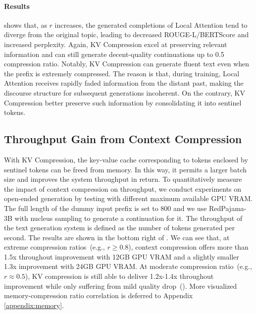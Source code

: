 \paragraph{Results}  shows that, as $r$ increases, the generated completions of Local Attention tend to diverge from the original topic, leading to decreased ROUGE-L/BERTScore and increased perplexity. Again, KV Compression excel at preserving relevant information and can still generate decent-quality continuations up to 0.5 compression ratio. Notably, KV Compression can generate fluent text even when the prefix is extremely compressed. The reason is that, during training, Local Attention receives rapidly faded information from the distant past, making the discourse structure for subsequent generations incoherent. On the contrary, KV Compression better preserve such information by consolidating it into sentinel tokens.

\subsection{Throughput Gain from Context Compression}
With KV Compression, the key-value cache corresponding to tokens enclosed by sentinel tokens can be freed from memory. In this way, it permits a larger batch size and improves the system throughput in return. To quantitatively measure the impact of context compression on throughput, we conduct experiments on open-ended generation by testing with different maximum available GPU VRAM. 
The full length of the dummy input prefix is set to 800 and we use RedPajama-3B with nucleus sampling to generate a continuation for it. The throughput of the text generation system is defined as the number of tokens generated per second. The results are shown in the bottom right of . We can see that, at extreme compression ratios~(e.g., $r\geq 0.8$), context compression offers more than 1.5x throughout improvement with 12GB GPU VRAM and a slightly smaller 1.3x improvement with 24GB GPU VRAM. 
At moderate compression ratio~(e.g., $r\approx 0.5$), KV compression is still able to deliver 1.2x-1.4x throughout improvement while only suffering from mild quality drop~(). More visualized memory-compression ratio correlation is deferred to Appendix \ref{appendix:memory}.
